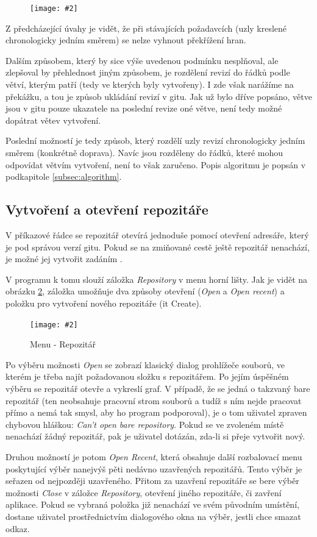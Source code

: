 \documentclass[
  biblatex,
  glossaries,
  index
]{kidiplom}
\newcommand{\pic}[4]{
\begin{figure}[h]
\centering
\texttt{[image: \#2]}
\caption{#3}
\label{fig:#4}
\end{figure}}
\begin{document}
\pic{10cm}{non-upward-planar.png}{}{non-upward-planar}

Z předcházející úvahy je vidět, že při stávajících požadavcích (uzly kreslené chronologicky jedním směrem) se nelze vyhnout překřížení hran.

Dalším způsobem, který by sice výše uvedenou podmínku nesplňoval, ale
zlepšoval by přehlednost jiným způsobem, je rozdělení revizí do řádků podle větví, kterým patří (tedy ve kterých byly vytvořeny). I zde však narážíme na překážku, a tou je způsob ukládání revizí v gitu. Jak už bylo dříve popsáno, větve jsou v gitu pouze ukazatele na poslední revize oné větve, není tedy možné dopátrat větev vytvoření.

Poslední možností je tedy způsob, který rozdělí uzly revizí chronologicky jedním směrem (konkrétně doprava). Navíc jsou rozděleny do řádků, které mohou odpovídat větvím vytvoření, není to však zaručeno. Popis algoritmu je popsán v podkapitole \ref{subsec:algorithm}.

\subsection{Vytvoření a otevření repozitáře}
V příkazové řádce se repozitář otevírá jednoduše pomocí otevření adresáře, který je pod správou verzí gitu. Pokud se na zmiňované cestě ještě repozitář nenachází, je možné jej vytvořit zadáním .

V programu k tomu slouží záložka {\it Repository} v menu horní lišty. Jak je vidět na obrázku \ref{fig:menu-repository}, záložka umožňuje dva způsoby otevření ({\it Open} a {\it Open recent}) a položku pro vytvoření nového repozitáře ({it Create}).

\pic{10cm}{Repository.png}{Menu - Repozitář}{menu-repository}

Po výběru možnosti {\it Open} se zobrazí klasický dialog prohlížeče souborů, ve kterém je třeba najít požadovanou složku s repozitářem. Po jejím úspěšném výběru se repozitář otevře a vykreslí graf. V případě, že se jedná o takzvaný bare repozitář (ten neobsahuje pracovní strom souborů a tudíž s ním nejde pracovat přímo a nemá tak smysl, aby ho program podporoval), je o tom uživatel zpraven chybovou hláškou: {\it Can't open bare repository}. Pokud se ve zvoleném místě nenachází žádný repozitář, pak je uživatel dotázán, zda-li si přeje vytvořit nový.

Druhou možností je potom {\it Open Recent}, která obsahuje další rozbalovací menu poskytující výběr nanejvýš pěti nedávno uzavřených repozitářů. Tento výběr je seřazen od nejpozději uzavřeného. Přitom za uzavření repozitáře se bere výběr možnosti {\it Close} v záložce {\it Repository}, otevření jiného repozitáře, či zavření aplikace. Pokud se vybraná položka již nenachází ve svém původním umístění, dostane uživatel prostřednictvím dialogového okna na výběr, jestli chce smazat odkaz.
\end{document}
